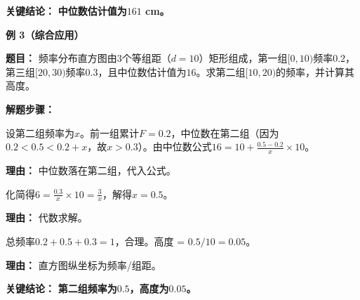 \begin{examplebox}
	\textbf{\textcolor{CExample}{关键结论：}}
	\textbf{中位数估计值为$161$ cm。}

	\medskip
	\textbf{\textcolor{CExample}{例 3（综合应用）}}

	\textbf{\textcolor{CExample}{题目：}}
	频率分布直方图由3个等组距（$d=10$）矩形组成，第一组$[0,10)$频率$0.2$，第三组$[20,30)$频率$0.3$，且中位数估计值为$16$。求第二组$[10,20)$的频率，并计算其高度。

	\textbf{\textcolor{CExample}{解题步骤：}}
	\begin{description}[style=nextline, leftmargin=2.8em, labelsep=0.5em, itemsep=0.45em]
		\item[\textbf{第一步（列方程）：}] 设第二组频率为$x$。前一组累计$F=0.2$，中位数在第二组（因为$0.2<0.5<0.2+x$，故$x>0.3$）。由中位数公式$16 = 10 + \frac{0.5-0.2}{x} \times 10$。
			\par\textbf{理由：} 中位数落在第二组，代入公式。
		\item[\textbf{第二步（求解$x$）：}] 化简得$6 = \frac{0.3}{x} \times 10 = \frac{3}{x}$，解得$x=0.5$。
			\par\textbf{理由：} 代数求解。
		\item[\textbf{第三步（验证与求高度）：}] 总频率$0.2+0.5+0.3=1$，合理。高度 = $0.5/10=0.05$。
			\par\textbf{理由：} 直方图纵坐标为频率/组距。
	\end{description}

	\textbf{\textcolor{CExample}{关键结论：}}
	\textbf{第二组频率为$0.5$，高度为$0.05$。}
\end{examplebox}
